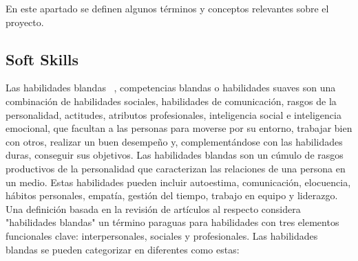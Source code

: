 
En este apartado se definen algunos términos y conceptos relevantes sobre el proyecto.

\subsection{Soft Skills}
Las habilidades blandas ~\cite{wiki:SoftSkills}, competencias blandas o habilidades suaves  son una combinación de habilidades sociales, habilidades de comunicación, rasgos de la personalidad, actitudes, atributos profesionales, inteligencia social e inteligencia emocional, que facultan a las personas para moverse por su entorno, trabajar bien con otros, realizar un buen desempeño y, complementándose con las habilidades duras, conseguir sus objetivos.
Las habilidades blandas son un cúmulo de rasgos productivos de la personalidad que caracterizan las relaciones de una persona en un medio. Estas habilidades pueden incluir autoestima, comunicación, elocuencia, hábitos personales, empatía, gestión del tiempo, trabajo en equipo y liderazgo. Una definición basada en la revisión de artículos al respecto considera "habilidades blandas" un término paraguas para habilidades con tres elementos funcionales clave: interpersonales, sociales y profesionales.
Las habilidades blandas se pueden categorizar en diferentes como estas:
